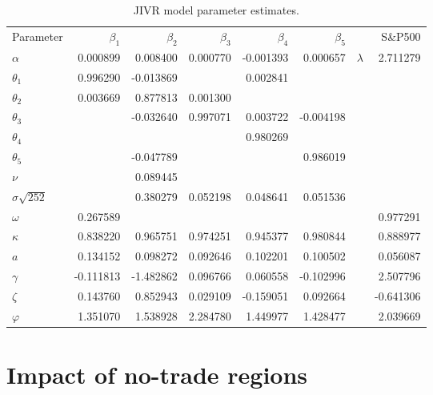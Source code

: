 \documentclass[12pt]{article}
\begin{document}
\begin{table}[H]
\centering
\renewcommand{\arraystretch}{1.5}
\caption{ JIVR model parameter estimates. }
\begin{tabular}{lrrrrrrr}
\toprule
Parameter  & $\beta_1$ & $\beta_2$ & $\beta_3$ & $\beta_4$ & $\beta_5$ & & S\&P500 \\
\cline{1-6}\cline{8-8}
$\alpha$ & 0.000899 & 0.008400 & 0.000770 & -0.001393 & 0.000657 & $\lambda$ & 2.711279 \\
$\theta_1$ & 0.996290 & -0.013869 &  & 0.002841 &  &  &\\
$\theta_2$ & 0.003669 & 0.877813 & 0.001300 &  &  &  &\\
$\theta_3$ &  & -0.032640 & 0.997071 & 0.003722 & -0.004198 &  &\\
$\theta_4$ &  &  &  & 0.980269 &  &  &\\
$\theta_5$ &  & -0.047789 &  &  & 0.986019 &  &\\
$\nu$ &  & 0.089445 &  &  &  &  &\\
$\sigma\sqrt{252}$ &  & 0.380279 & 0.052198 & 0.048641 & 0.051536 &  &\\
$\omega$ & 0.267589 &  &  &  &  & & 0.977291 \\
$\kappa$ & 0.838220 & 0.965751 & 0.974251 & 0.945377 & 0.980844 & & 0.888977 \\
$a$ & 0.134152 & 0.098272 & 0.092646 & 0.102201 & 0.100502 & & 0.056087 \\
$\gamma$ & -0.111813 & -1.482862 & 0.096766 & 0.060558 & -0.102996 & & 2.507796 \\
$\zeta$ & 0.143760 & 0.852943 & 0.029109 & -0.159051 & 0.092664 & & -0.641306 \\
$\varphi$ & 1.351070 & 1.538928 & 2.284780 & 1.449977 & 1.428477 & & 2.039669 \\
\bottomrule
\end{tabular}
\end{table}

\section{Impact of no-trade regions}\label{subsub:rebalancing}
\end{document}
